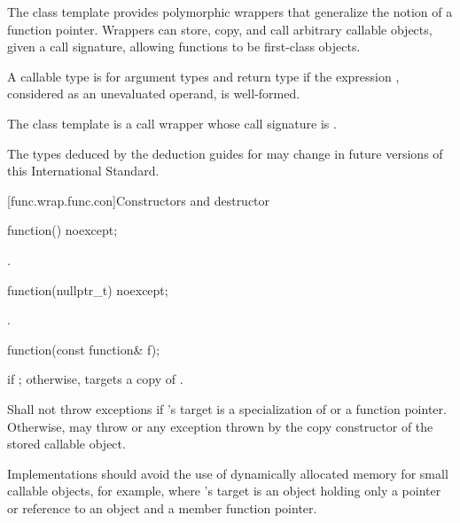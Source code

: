 \pnum
The  class template provides polymorphic wrappers that
generalize the notion of a function pointer. Wrappers can store, copy,
and call arbitrary callable objects, given a call
signature, allowing functions to be first-class objects.

\pnum
{}%
A callable type 
is  for argument
types 
and return type 
if the expression
,
considered as an unevaluated operand, is
well-formed.

\pnum
The  class template is a call
wrapper whose call signature
is .

\pnum
\begin{note}
The types deduced by the deduction guides for 
may change in future versions of this International Standard.
\end{note}

[func.wrap.func.con]{Constructors and destructor}

%
\begin{itemdecl}
function() noexcept;
\end{itemdecl}

\begin{itemdescr}
\pnum\ensures {}.
\end{itemdescr}

%
\begin{itemdecl}
function(nullptr_t) noexcept;
\end{itemdecl}

\begin{itemdescr}
\pnum
\ensures {}.
\end{itemdescr}

%
\begin{itemdecl}
function(const function& f);
\end{itemdecl}

\begin{itemdescr}
\pnum
\ensures {} if ; otherwise,
 targets a copy of .

\pnum
\throws Shall not throw exceptions if 's target is
a specialization of  or
a function pointer. Otherwise, may throw 
or any exception thrown by the copy constructor of the stored callable object.
\begin{note} Implementations should avoid the use of
dynamically allocated memory for small callable objects, for example, where
's target is an object holding only a pointer or reference
to an object and a member function pointer. \end{note}
\end{itemdescr}

